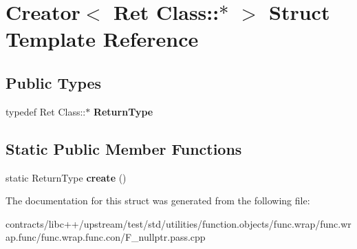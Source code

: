 \hypertarget{struct_creator_3_01_ret_01_class_1_1_5_01_4}{}\section{Creator$<$ Ret Class\+:\+:$\ast$ $>$ Struct Template Reference}
\label{struct_creator_3_01_ret_01_class_1_1_5_01_4}
\subsection*{Public Types}
\begin{DoxyCompactItemize}
\item 
\mbox{\label{struct_creator_3_01_ret_01_class_1_1_5_01_4_a6dde4db39c9bd5d0af480076869a1c9f}} 
typedef Ret Class\+::$\ast$ {\bfseries Return\+Type}
\end{DoxyCompactItemize}
\subsection*{Static Public Member Functions}
\begin{DoxyCompactItemize}
\item 
\mbox{\label{struct_creator_3_01_ret_01_class_1_1_5_01_4_a3546a4f2cef8d3b7031769c4976cef0a}} 
static Return\+Type {\bfseries create} ()
\end{DoxyCompactItemize}


The documentation for this struct was generated from the following file\+:\begin{DoxyCompactItemize}
\item 
contracts/libc++/upstream/test/std/utilities/function.\+objects/func.\+wrap/func.\+wrap.\+func/func.\+wrap.\+func.\+con/F\+\_\+nullptr.\+pass.\+cpp\end{DoxyCompactItemize}
